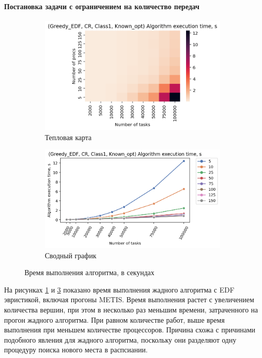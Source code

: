 \paragraph{Постановка задачи с ограничением на количество передач}

\begin{figure}[!htbp]
    \centering
    \begin{subfigure}{0.49\textwidth}
        \includegraphics[width=\textwidth]{imgs/ideal_1/CR_EDF/et_heatmap.png}
        \caption{Тепловая карта}
        \label{fig:CR-EDF-exec-time-heatmap}
    \end{subfigure}
    \hfill
    \begin{subfigure}{0.49\textwidth}
        \includegraphics[width=\textwidth]{imgs/ideal_1/CR_EDF/tr_graph.png}
        \caption{Сводный график}
        \label{fig:CR-EDF-exec-time-compiled}
    \end{subfigure}
    \caption{Время выполнения алгоритма, в секундах}
\end{figure}

На рисунках \ref{fig:CR-EDF-exec-time-heatmap} и \ref{fig:CR-EDF-exec-time-compiled} показано время выполнения жадного алгоритма с EDF эвристикой, включая прогоны METIS. Время выполнения растет с увеличением количества вершин, при этом в несколько раз меньшим времени, затраченного на прогон жадного алгоритма. При равном количестве работ, выше время выполнения при меньшем количестве процессоров. Причина схожа с причинами подобного явления для жадного алгоритма, поскольку они разделяют одну процедуру поиска нового места в распсиании. 


